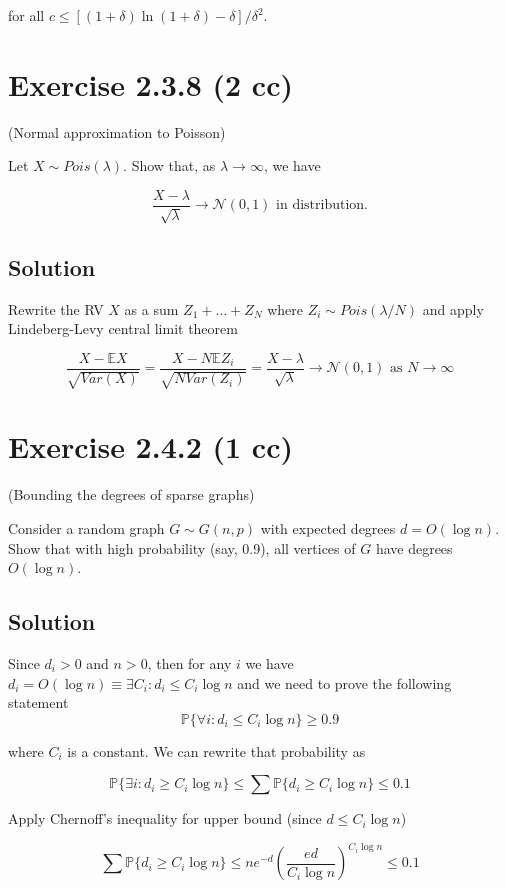 \documentclass{article}
\begin{document}
for all $c \leq [(1+\delta)\ln (1+\delta) - \delta]/\delta^2$.

\section{Exercise 2.3.8 (2 cc)}
(Normal approximation to Poisson)

Let $X \sim Pois(\lambda)$. Show that, as $\lambda \to \infty$, we have

$$\frac{X-\lambda}{\sqrt \lambda} \to \mathcal N(0, 1) \text{ in distribution.}$$

\subsection{Solution}

Rewrite the RV $X$ as a sum $Z_1 + \dots + Z_N$ where $Z_i \sim Pois(\lambda/N)$ and apply Lindeberg-Levy central limit theorem

$$\frac{X - \mathbb E X}{\sqrt{Var(X)}} = \frac{X - N \mathbb E Z_i}{\sqrt{N Var(Z_i)}} = \frac{X-\lambda}{\sqrt \lambda} \to \mathcal N(0, 1) \text{ as } N \to \infty$$

\section{Exercise 2.4.2 (1 cc)}

(Bounding the degrees of sparse graphs)

Consider a random graph $G \sim G(n,p)$ with expected degrees $d = O(\log n)$. Show that with high probability (say, 0.9), all vertices of $G$ have degrees $O(\log n)$.

\subsection{Solution}

Since $d_i > 0$ and $n > 0$, then for any $i$ we have $d_i = O(\log n) \equiv \exists C_i: d_i \leq C_i \log n$ and we need to prove the following statement
$$\mathbb P \{ \forall i : d_i \leq C_i \log n \} \geq 0.9$$

where $C_i$ is a constant. We can rewrite that probability as

$$\mathbb P \{ \exists i : d_i \geq C_i \log n \} \leq \sum \mathbb P \{ d_i \geq C_i \log n \} \leq 0.1$$

Apply Chernoff’s inequality for upper bound (since $d \leq C_i \log n$)

$$ \sum \mathbb P \{ d_i \geq C_i \log n \} \leq n e^{-d} \left(\frac{e d}{C_i \log n}\right)^{C_i \log n} \leq 0.1$$
\end{document}

